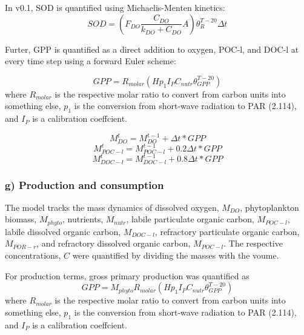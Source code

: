 \documentclass[
  letterpaper,
  DIV=11,
  numbers=noendperiod]{scrartcl}
\begin{document}
\begin{tcolorbox}[enhanced jigsaw, breakable, toprule=.15mm, rightrule=.15mm, bottomtitle=1mm, left=2mm, bottomrule=.15mm, leftrule=.75mm, opacityback=0, toptitle=1mm, arc=.35mm, coltitle=black, colframe=quarto-callout-note-color-frame, title=\textcolor{quarto-callout-note-color}{\faInfo}\hspace{0.5em}{Note}, opacitybacktitle=0.6, titlerule=0mm, colback=white, colbacktitle=quarto-callout-note-color!10!white]

In v0.1, SOD is quantified using Michaelis-Menten kinetics: \[
SOD = (F_{DO} \frac{C_{DO}}{k_{DO} + C_{DO}} A)\theta_{R}^{T-20} \Delta t
\]

Furter, GPP is quantified as a direct addition to oxygen, POC-l, and
DOC-l at every time step using a forward Euler scheme:

\[
GPP = R_{molar} (H p_1 I_P C_{nutr} \theta_{GPP}^{T-20})
\] where \(R_{molar}\) is the respective molar ratio to convert from
carbon units into something else, \(p_1\) is the conversion from
short-wave radiation to PAR (2.114), and \(I_P\) is a calibration
coeffcient.

\[
M_{DO}^{t} = M_{DO}^{t-1} + \Delta t * GPP 
\] \[
M_{POC-l}^{t} = M_{POC-l}^{t-1} + 0.2 \Delta t * GPP 
\] \[
M_{DOC-l}^{t} = M_{DOC-l}^{t-1} + 0.8 \Delta t * GPP 
\]

\end{tcolorbox}

\hypertarget{g-production-and-consumption}{%
\subsubsection{g) Production and
consumption}\label{g-production-and-consumption}}

The model tracks the mass dynamics of dissolved oxygen, \(M_{DO}\),
phytoplankton biomass, \(M_{phyto}\), nutrients, \(M_{nutr}\), labile
particulate organic carbon, \(M_{POC-l}\), labile dissolved organic
carbon, \(M_{DOC-l}\), refractory particulate organic carbon,
\(M_{POR-r}\), and refractory dissolved organic carbon, \(M_{POC-l}\).
The respective concentrations, \(C\) were quantified by dividing the
masses with the voume.

For production terms, gross primary production was quantified as \[
GPP = M_{phyto} R_{molar} (H p_1 I_P C_{nutr} \theta_{GPP}^{T-20})
\] where \(R_{molar}\) is the respective molar ratio to convert from
carbon units into something else, \(p_1\) is the conversion from
short-wave radiation to PAR (2.114), and \(I_P\) is a calibration
coeffcient.
\end{document}

